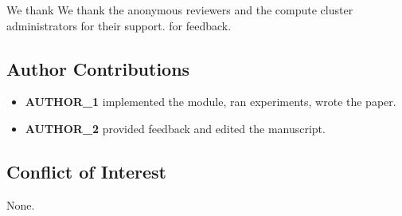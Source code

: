 We thank We thank the anonymous reviewers and the compute cluster administrators for their support. for feedback.

\subsection{Author Contributions}

\begin{itemize}
\item \textbf{{{AUTHOR\_1}}} implemented the module, ran experiments, wrote the paper.
\item \textbf{{{AUTHOR\_2}}} provided feedback and edited the manuscript.

\end{itemize}
\subsection{Conflict of Interest}

None.

